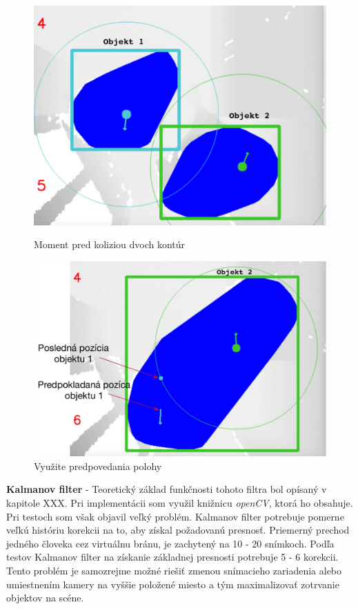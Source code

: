 \begin{figure}[H]
  \centering
  \begin{minipage}[b]{0.4\textwidth}
    \includegraphics[width=\textwidth]{obrazky/predSpojenim}
    \caption{Moment pred koliziou dvoch kontúr}
  \end{minipage}
  \hfill
  \begin{minipage}[b]{0.55\textwidth}
    \includegraphics[width=\textwidth]{obrazky/spojenie}
    \caption{Využite predpovedania polohy}
  \end{minipage}
\end{figure}



\textbf{Kalmanov filter} - Teoretický základ funkčnosti tohoto filtra bol opísaný v kapitole XXX. Pri implementácii som využil knižnicu \textit{openCV}, ktorá ho obsahuje. Pri testoch som však objavil veľký problém. Kalmanov filter potrebuje pomerne veľkú históriu korekcii na to, aby získal požadovanú presnosť. Priemerný prechod jedného človeka cez virtuálnu bránu, je zachytený na 10 - 20 snímkoch. Podľa testov Kalmanov filter na získanie základnej presnosti potrebuje 5 - 6 korekcii. Tento problém je samozrejme možné riešiť zmenou snímacieho zariadenia alebo umiestnením kamery na vyššie položené miesto a tým maximalizovať zotrvanie objektov na scéne. 

